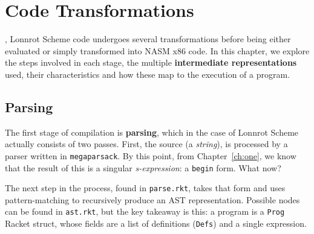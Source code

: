 \chapter{Code Transformations}\label{ch:two}


, Lonnrot Scheme code undergoes several
transformations before being either evaluated or simply transformed into NASM x86 code.
In this chapter, we explore the steps involved in each stage, the multiple
\textbf{intermediate representations} used, their characteristics and how these map
to the execution of a program.

\section{Parsing}\label{sec:ch2_parsing}
The first stage of compilation is \textbf{parsing}, which in the case of Lonnrot
Scheme actually consists of two passes. 
First, the source (a \textit{string}), is processed by a parser written in \texttt{megaparsack}.
By this point, from Chapter~\ref{ch:one}, we know that the result of this is a singular
\textit{s-expression}: a \texttt{begin} form. What now?

The next step in the process, found in \texttt{parse.rkt}, takes that form and uses pattern-matching
to recursively produce an AST representation. Possible nodes can be found in \texttt{ast.rkt}, but
the key takeaway is this: a program is a \texttt{Prog} Racket struct, whose fields are a list of
definitions (\texttt{Defs}) and a single expression.

